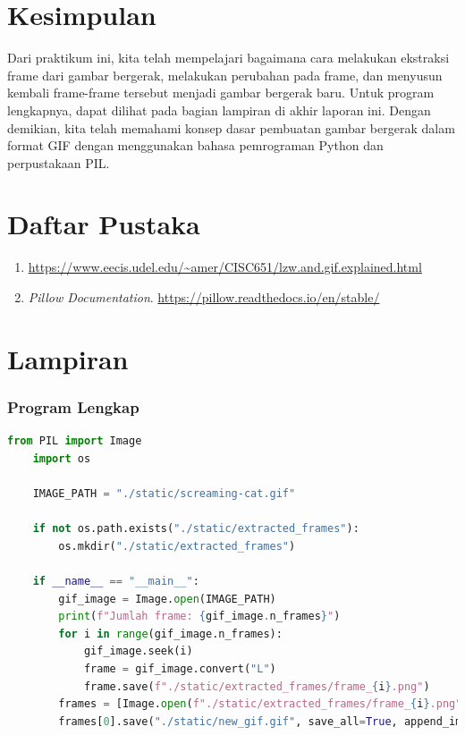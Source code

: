 \documentclass{assignment}
\newcommand\tab[1][0.5cm]{\hspace*{#1}}
\begin{document}
\section*{Kesimpulan}
\tab Dari praktikum ini, kita telah mempelajari bagaimana cara melakukan ekstraksi frame dari gambar bergerak, melakukan perubahan pada frame, dan menyusun kembali frame-frame tersebut menjadi gambar bergerak baru. Untuk program lengkapnya, dapat dilihat pada bagian lampiran di akhir laporan ini. Dengan demikian, kita telah memahami konsep dasar pembuatan gambar bergerak dalam format GIF dengan menggunakan bahasa pemrograman Python dan perpustakaan PIL.


\break

\section*{Daftar Pustaka}


\begin{enumerate}
    \item \url{https://www.eecis.udel.edu/~amer/CISC651/lzw.and.gif.explained.html}
    \item \textit{Pillow Documentation}. \url{https://pillow.readthedocs.io/en/stable/}
\end{enumerate}

\break

\section*{Lampiran}
\subsubsection*{Program Lengkap}
\begin{lstlisting}[language=Python ,style=code]
    from PIL import Image
    import os

    IMAGE_PATH = "./static/screaming-cat.gif"

    if not os.path.exists("./static/extracted_frames"):
        os.mkdir("./static/extracted_frames")

    if __name__ == "__main__":
        gif_image = Image.open(IMAGE_PATH)
        print(f"Jumlah frame: {gif_image.n_frames}")
        for i in range(gif_image.n_frames):
            gif_image.seek(i)
            frame = gif_image.convert("L")
            frame.save(f"./static/extracted_frames/frame_{i}.png")
        frames = [Image.open(f"./static/extracted_frames/frame_{i}.png") for i in range(gif_image.n_frames)]
        frames[0].save("./static/new_gif.gif", save_all=True, append_images=frames[1:], loop=0, duration=gif_image.info["duration"])
\end{lstlisting}
\end{document}
